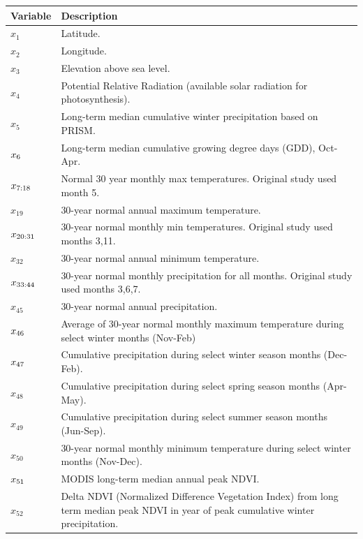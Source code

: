 \def\year{2017}\relax \documentclass[letterpaper]{article}
\begin{document}
\begin{table}
\begin{tabularx}{\linewidth}{@{ }l X@{ }}
\toprule[.2em]
{\bf Variable} &{\bf Description} \\
\midrule
$x_1$ & Latitude.\\
$x_2$ & Longitude. \\
\cellcolor[gray]{0.9}$x_3$ & \cellcolor[gray]{0.9}Elevation above sea level.\\
\cellcolor[gray]{0.9}$x_4$ & \cellcolor[gray]{0.9}Potential Relative Radiation (available solar radiation for photosynthesis).\\
$x_{5}$ & Long-term median cumulative winter precipitation based on PRISM.\\
$\cellcolor[gray]{0.9}x_{6}$ & \cellcolor[gray]{0.9}Long-term median cumulative growing degree days (GDD), Oct-Apr.\\
$\cellcolor[gray]{0.9}x_{7:18}$ & \cellcolor[gray]{0.9}Normal 30 year monthly max temperatures. Original study used month 5.\\
$x_{19}$ & 30-year normal annual maximum temperature.\\
$\cellcolor[gray]{0.9}x_{20:31}$ & \cellcolor[gray]{0.9}30-year normal monthly min temperatures. Original study used months 3,11.\\
$x_{32}$ & 30-year normal annual minimum temperature.\\
$\cellcolor[gray]{0.9}x_{33:44}$ & \cellcolor[gray]{0.9}30-year normal monthly precipitation for all months. Original study used months 3,6,7.\\
$x_{45}$ & 30-year normal annual precipitation.\\
$\cellcolor[gray]{0.9}x_{46}$ &\cellcolor[gray]{0.9} Average of 30-year normal monthly maximum temperature during select winter months (Nov-Feb)\\
$\cellcolor[gray]{0.9}x_{47}$ &\cellcolor[gray]{0.9} Cumulative precipitation during select winter season months (Dec-Feb).\\
$x_{48}$ & Cumulative precipitation during select spring season months (Apr-May).\\
$x_{49}$ & Cumulative precipitation during select  summer season months (Jun-Sep).\\
$x_{50}$ & 30-year normal monthly minimum temperature during select winter months (Nov-Dec).\\
$\cellcolor[gray]{0.9}x_{51}$&\cellcolor[gray]{0.9}MODIS long-term median annual peak NDVI.\\
\cellcolor[gray]{0.9}$x_{52}$ & \cellcolor[gray]{0.9}Delta NDVI (Normalized Difference Vegetation Index) from long term median peak NDVI in year of peak cumulative winter precipitation.\\

\end{tabularx}
\end{table}
\end{document}

